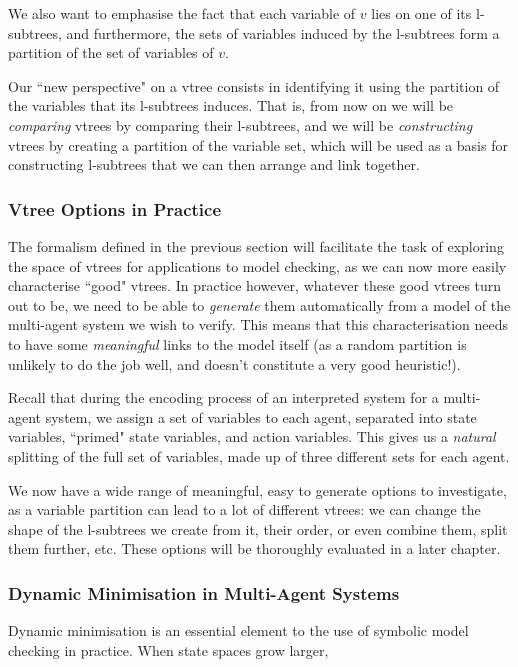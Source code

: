 \documentclass[11pt]{article}
\begin{document}
We also want to emphasise the fact that each variable of $v$ lies on one of its l-subtrees, and furthermore, the sets of variables induced by the l-subtrees form a partition of the set of variables of $v$.

Our ``new perspective" on a vtree consists in identifying it using the partition of the variables that its l-subtrees induces. That is, from now on we will be \textit{comparing }vtrees by comparing their l-subtrees, and we will be \textit{constructing }vtrees by creating a partition of the variable set, which will be used as a basis for constructing l-subtrees that we can then arrange and link together.

\subsubsection{Vtree Options in Practice}

The formalism defined in the previous section will facilitate the task of exploring the space of vtrees for applications to model checking, as we can now more easily characterise ``good" vtrees. In practice however, whatever these good vtrees turn out to be, we need to be able to \textit{generate} them automatically from a model of the multi-agent system we wish to verify. This means that this characterisation needs to have some \textit{meaningful} links to the model itself (as a random partition is unlikely to do the job well, and doesn't constitute a very good heuristic!).

Recall that during the encoding process of an interpreted system for a multi-agent system, we assign a set of variables to each agent, separated into state variables, ``primed" state variables, and action variables. This gives us a \textit{natural} splitting of the full set of variables, made up of three different sets for each agent.

We now have a wide range of meaningful, easy to generate options to investigate, as a variable partition can lead to a lot of different vtrees: we can change the shape of the l-subtrees we create from it, their order, or even combine them, split them further, etc. These options will be thoroughly evaluated in a later chapter. 

\subsubsection{Dynamic Minimisation in Multi-Agent Systems}

Dynamic minimisation is an essential element to the use of symbolic model checking in practice. When state spaces grow larger, 
\end{document}
